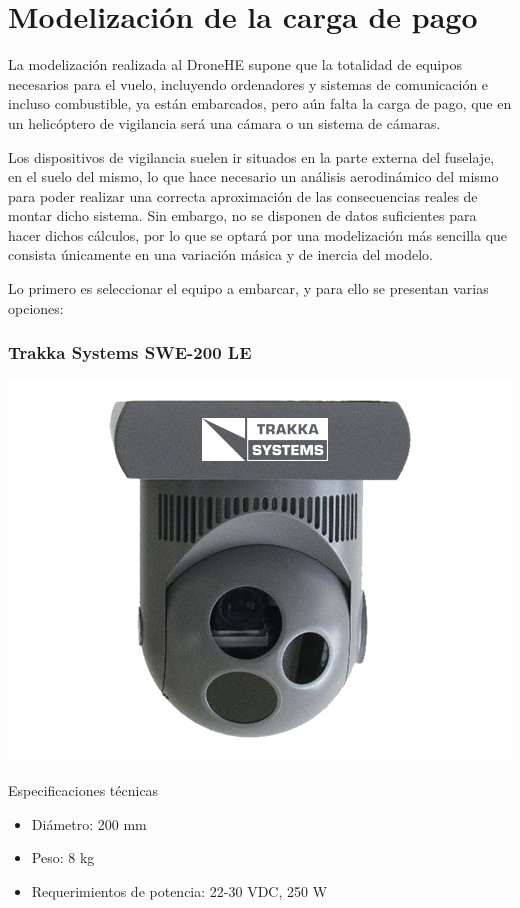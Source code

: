 \section{Modelización de la carga de pago}

La modelización realizada al DroneHE supone que la totalidad de equipos necesarios para el vuelo, incluyendo ordenadores y sistemas de comunicación e incluso combustible, ya están embarcados, pero aún falta la carga de pago, que en un helicóptero de vigilancia será una cámara o un sistema de cámaras.

Los dispositivos de vigilancia suelen ir situados en la parte externa del fuselaje, en el suelo del mismo, lo que hace necesario un análisis aerodinámico del mismo para poder realizar una correcta aproximación de las consecuencias reales de montar dicho sistema. Sin embargo, no se disponen de datos suficientes para hacer dichos cálculos, por lo que se optará por una modelización más sencilla que consista únicamente en una variación másica y de inercia del modelo. 

Lo primero es seleccionar el equipo a embarcar, y para ello se presentan varias opciones:

\subsubsection*{Trakka Systems SWE-200 LE}

\noindent\begin{minipage}{0.3\textwidth}%
	\includegraphics[width=\linewidth]{imagenes/200-LE}
\end{minipage}%
\hfill%
\begin{minipage}{0.7\textwidth}
Especificaciones técnicas
	\begin{itemize}
		\item Diámetro: 200 mm
		\item Peso: 8 kg
		\item Requerimientos de potencia: 22-30 VDC, 250 W
	\end{itemize}
\end{minipage}

